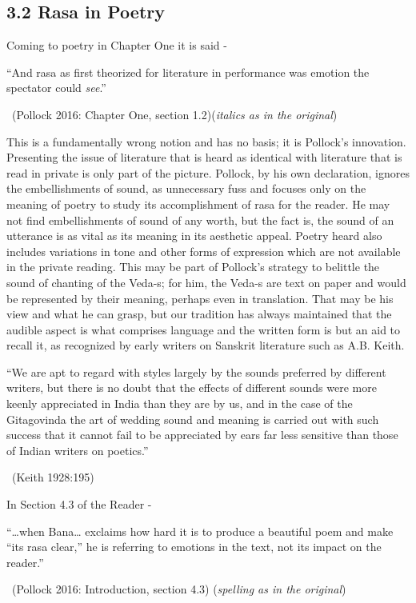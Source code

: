 \subsection*{3.2 Rasa in Poetry}

Coming to poetry in Chapter One it is said -

\begin{myquote}
“And rasa as first theorized for literature in performance was emotion the spectator could \textit{see}.” 

~\hfill (Pollock 2016: Chapter One, section 1.2)(\textit{italics as in the original})
\end{myquote}

This is a fundamentally wrong notion and has no basis; it is Pollock’s innovation. Presenting the issue of literature that is heard as identical with literature that is read in private is only part of the picture. Pollock, by his own declaration, ignores the embellishments of sound, as unnecessary fuss and focuses only on the meaning of poetry to study its accomplishment of rasa for the reader. He may not find embellishments of sound of any worth, but the fact is, the sound of an utterance is as vital as its meaning in its aesthetic appeal. Poetry heard also includes variations in tone and other forms of expression which are not available in the private reading. This may be part of Pollock’s strategy to belittle the sound of chanting of the Veda-s; for him, the Veda-s are text on paper and would be represented by their meaning, perhaps even in translation. That may be his view and what he can grasp, but our tradition has always maintained that the audible aspect is what comprises language and the written form is but an aid to recall it, as recognized by early writers on Sanskrit literature such as A.B. Keith.

\begin{myquote}
“We are apt to regard with styles largely by the sounds preferred by different writers, but there is no doubt that the effects of different sounds were more keenly appreciated in India than they are by us, and in the case of the Gitagovinda the art of wedding sound and meaning is carried out with such success that it cannot fail to be appreciated by ears far less sensitive than those of Indian writers on poetics.” 

~\hfill (Keith 1928:195)
\end{myquote}

In Section 4.3 of the Reader -

\begin{myquote}
“…when Bana… exclaims how hard it is to produce a beautiful poem and make “its rasa clear,” he is referring to emotions in the text, not its impact on the reader.” 

~\hfill (Pollock 2016: Introduction, section 4.3) (\textit{spelling as in the original})
\end{myquote}


